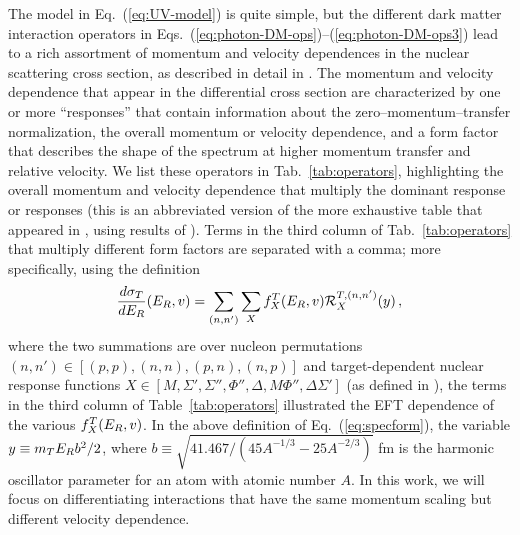 \documentclass[11pt, a4paper]{article}
\newcommand{\Eq}[1]{Eq.~(\ref{#1})} \newcommand{\Eqs}[2]{Eqs.~(\ref{#1}) and (\ref{#2})} \newcommand{\Eqm}[2]{Eqs.~(\ref{#1}) through (\ref{#2})}
\newcommand{\Tab}[1]{Tab.~\ref{#1}}
\begin{document}
The model in \Eq{eq:UV-model} is quite simple, but the different dark matter interaction operators in Eqs.~(\ref{eq:photon-DM-ops})--(\ref{eq:photon-DM-ops3}) lead to a rich assortment of momentum and velocity dependences in the nuclear scattering cross section, as described in detail in \cite{Gresham:2014vja, Gluscevic:2015sqa}. The momentum and velocity dependence that appear in the differential cross section are characterized by one or more ``responses'' that contain information about the zero--momentum--transfer normalization, the overall momentum or velocity dependence, and a form factor that describes the shape of the spectrum at higher momentum transfer and relative velocity. We list these operators in \Tab{tab:operators}, highlighting the overall momentum and velocity dependence that multiply the dominant response or responses (this is an abbreviated version of the more exhaustive table that appeared in \cite{Gluscevic:2015sqa}, using results of \cite{Gresham:2014vja, Gluscevic:2015sqa}). Terms in the third column of \Tab{tab:operators} that multiply different form factors are separated with a comma; more specifically, using the definition
\begin{equation}\label{eq:specform}
\frac{d \sigma_T}{d E_R}(E_R,v) = \sum_{(n,n')} \sum_{X} f_X^T(E_R,v) \mathcal{R}_X^{T,(n,n')}(y) \, , 
\end{equation}
where the two summations are over nucleon permutations $(n,n') \in  \left[ (p,p),(n,n),(p,n),(n,p) \right]$ and target-dependent nuclear response functions $X \in \left[M,\Sigma',\Sigma'',\Phi'',\Delta,M\Phi'',\Delta\Sigma' \right]$ (as defined in \cite{Anand:2013yka}), the terms in the third column of Table~\ref{tab:operators} illustrated the EFT dependence of the various $f_X^T(E_R,v)$. In the above definition of \Eq{eq:specform}, the variable $y \equiv m_T E_R b^2/2$, where $b \equiv \sqrt{41.467/(45A^{-1/3} - 25A^{-2/3})}$ fm is the harmonic oscillator parameter for an atom with atomic number $A$. In this work, we will focus on differentiating interactions that have the same momentum scaling but different velocity dependence.
\end{document}
